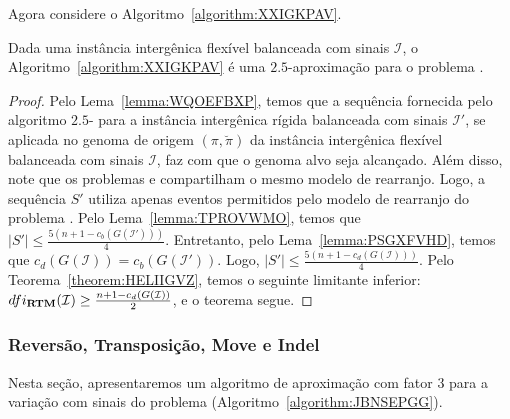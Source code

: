 Agora considere o Algoritmo~\ref{algorithm:XXIGKPAV}.



\begin{theorem}\label{theorem:BZSXXPYW}
Dada uma instância intergênica flexível balanceada com sinais $\mathcal{I}$, o Algoritmo~\ref{algorithm:XXIGKPAV} é uma $2.5$-aproximação para o problema \SbFIRTM{}.
\end{theorem}
\begin{proof}
Pelo Lema~\ref{lemma:WQOEFBXP}, temos que a sequência fornecida pelo algoritmo $2.5$-\SbIRTM{} para a instância intergênica rígida balanceada com sinais $\mathcal{I'}$, se aplicada no genoma de origem $(\pi,\breve\pi)$ da instância intergênica flexível balanceada com sinais $\mathcal{I}$, faz com que o genoma alvo seja alcançado. Além disso, note que os problemas \SbIRTM{} e \SbFIRTM{} compartilham o mesmo modelo de rearranjo. Logo, a sequência $S'$ utiliza apenas eventos permitidos pelo modelo de rearranjo do problema \SbFIRTM{}. Pelo Lema~\ref{lemma:TPROVWMO}, temos que $|S'| \le \frac{5({n+1} - c_b(G(\mathcal{I}')))}{4}$. Entretanto, pelo Lema~\ref{lemma:PSGXFVHD}, temos que $c_d(G(\mathcal{I})) = c_b(G(\mathcal{I}'))$. Logo, $|S'| \le \frac{5({n+1} - c_d(G(\mathcal{I})))}{4}$. Pelo Teorema~\ref{theorem:HELIIGVZ}, temos o seguinte limitante inferior: $dfi_{\textbf{RTM}}(\mathcal{I}) \ge \frac{{n+1} - c_d(G(\mathcal{I}))}{2}$, e o teorema segue.
\end{proof}

\subsubsection{Reversão, Transposição, Move e Indel}

Nesta seção, apresentaremos um algoritmo de aproximação com fator $3$ para a variação com sinais do problema \SbFIRTMI{} (Algoritmo~\ref{algorithm:JBNSEPGG}).



